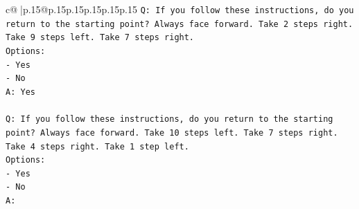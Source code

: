\documentclass{article}
\begin{document}
{\begin{supertabular}{c@{$\;$}|p{.15\linewidth}@{}p{.15\linewidth}p{.15\linewidth}p{.15\linewidth}p{.15\linewidth}p{.15\linewidth}}
{{{\texttt{Q: If you follow these instructions, do you return to the starting point? Always face forward. Take 2 steps right. Take 9 steps left. Take 7 steps right.} \\
\texttt{Options:} \\
\texttt{{-} Yes} \\
\texttt{{-} No} \\
\texttt{A: Yes} \\
\\ 
\texttt{Q: If you follow these instructions, do you return to the starting point? Always face forward. Take 10 steps left. Take 7 steps right. Take 4 steps right. Take 1 step left.} \\
\texttt{Options:} \\
\texttt{{-} Yes} \\
\texttt{{-} No} \\
\texttt{A:} \\
            }
        }
    }
     \\ \\


\end{supertabular}}
\end{document}
